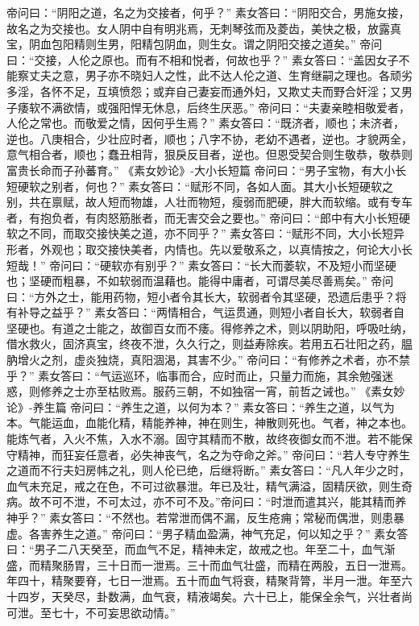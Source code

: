 \documentclass[12pt,UTF8]{ctexbook}
\begin{document}
帝问曰：“阴阳之道，名之为交接者，何乎？”
素女答曰：“阴阳交合，男施女接，故名之为交接也。女人阴中自有明兆焉，无刺琴弦而及菱齿，美快之极，放露真宝，阴血包阳精则生男，阳精包阴血，则生女。谓之阴阳交接之道矣。”
帝问曰：“交接，人伦之原也。而有不相和悦者，何故也乎？”
素女答曰：“盖因女子不能察丈夫之意，男子亦不晓妇人之性，此不达人伦之道、生育继嗣之理也。各顽劣多淫，各怀不足，互填愤怨；或弃自己妻妄而通外妇，又欺丈夫而野合奸淫；又男子痿软不满欲情，或强阳悍无休息，后终生厌恶。”
帝问曰：“夫妻亲睦相敬爱者，人伦之常也。而敬爱之情，因何乎生焉？”
素女答曰：“既济者，顺也；未济者，逆也。八庚相合，少壮应时者，顺也；八字不协，老幼不遇者，逆也。才貌两全，意气相合者，顺也；蠢丑相背，狠戾反目者，逆也。但恩受契合则生敬恭，敬恭则富贵长命而子孙蕃育。”
《素女妙论》-大小长短篇
帝问曰：“男子宝物，有大小长短硬软之别者，何也？”
素女答曰：“赋形不同，各如人面。其大小长短硬软之别，共在禀赋，故人短而物雄，人壮而物短，瘦弱而肥硬，胖大而软缩。或有专车者，有抱负者，有肉怒筋胀者，而无害交会之要也。”
帝问曰：“郎中有大小长短硬软之不同，而取交接快美之道，亦不同乎？”
素女答曰：“赋形不同，大小长短异形者，外观也；取交接快美者，内情也。先以爱敬系之，以真情按之，何论大小长短哉！”
帝问曰：“硬软亦有别乎？”
素女答曰：“长大而萎软，不及短小而坚硬也；坚硬而粗暴，不如软弱而温藉也。能得中庸者，可谓尽美尽善焉矣。”
帝问曰：“方外之士，能用药物，短小者令其长大，软弱者令其坚硬，恐遗后患乎？将有补导之益乎？”
素女答曰：“两情相合，气运贯通，则短小者自长大，软弱者自坚硬也。有道之士能之，故御百女而不痿。得修养之术，则以阴助阳，呼吸吐纳，借水救火，固济真宝，终夜不泄，久久行之，则益寿除疾。若用五石壮阳之药，腽肭增火之剂，虚炎独烧，真阳涸渴，其害不少。”
帝问曰：“有修养之术者，亦不禁乎？”
素女答曰：“气运巡环，临事而合，应时而止，只量力而施，其余勉强迷惑，则修养之士亦至枯败焉。服药三朝，不如独宿一宵，前哲之诫也。”
《素女妙论》-养生篇
帝问曰：“养生之道，以何为本？”
素女答曰：“养生之道，以气为本。气能运血，血能化精，精能养神，神在则生，神散则死也。气者，神之本也。能炼气者，入火不焦，入水不溺。固守其精而不散，故终夜御女而不泄。若不能保守精神，而狂妄任意者，必失神丧气，名之为夺命之斧。”
帝问曰：“若人专守养生之道而不行夫妇房帏之礼，则人伦已绝，后继将断。”
素女答曰：“凡人年少之时，血气未充足，戒之在色，不可过欲暴泄。年已及壮，精气满溢，固精厌欲，则生奇病。故不可不泄，不可太过，亦不可不及。”帝问曰：“时泄而遣其兴，能其精而养神乎？”
素女答曰：“不然也。若常泄而偶不漏，反生疮痈；常秘而偶泄，则患暴虚。各害养生之道。”
帝问曰：“男子精血盈满，神气充足，何以知之乎？”
素女答曰：“男子二八天癸至，而血气不足，精神未定，故戒之也。年至二十，血气渐盛，而精聚肠胃，三十日而一泄焉。三十而血气壮盛，而精在两股，五日一泄焉。年四十，精聚要脊，七日一泄焉。五十而血气将衰，精聚背膂，半月一泄。年至六十四岁，天癸尽，卦数满，血气衰，精液竭矣。六十已上，能保全余气，兴壮者尚可泄。至七十，不可妄思欲动情。”
\end{document}
